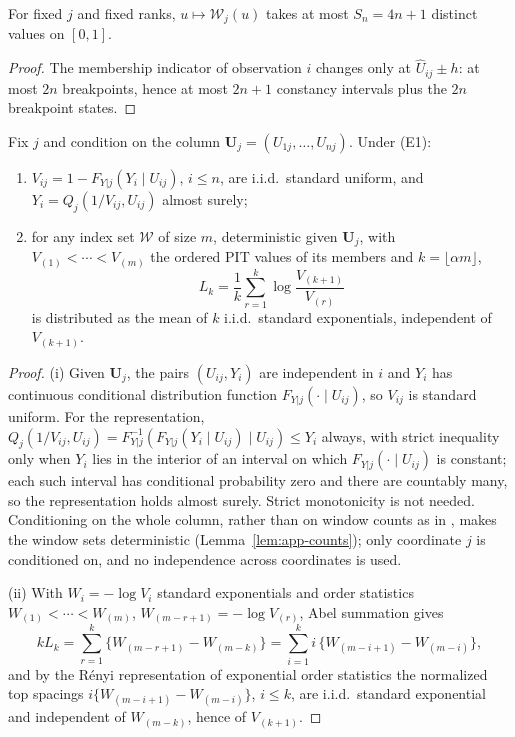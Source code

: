 \begin{lemma}\label{lem:app-states}
For fixed $j$ and fixed ranks, $u\mapsto\mathcal W_j(u)$ takes at most
$S_n=4n+1$ distinct values on $[0,1]$.
\end{lemma}

\begin{proof}
The membership indicator of observation $i$ changes only at
$\widehat U_{ij}\pm h$: at most $2n$ breakpoints, hence at most $2n+1$
constancy intervals plus the $2n$ breakpoint states.
\end{proof}

\begin{lemma}\label{lem:app-pit}
Fix $j$ and condition on the column $\bm U_j=(U_{1j},\ldots,U_{nj})$.
Under (E1):
\begin{enumerate}
\item $V_{ij}=1-F_{Y|j}(Y_i\mid U_{ij})$, $i\le n$, are i.i.d.\ standard
uniform, and $Y_i=Q_j(1/V_{ij},U_{ij})$ almost surely;
\item for any index set $\mathcal W$ of size $m$, deterministic given
$\bm U_j$, with $V_{(1)}<\cdots<V_{(m)}$ the ordered PIT values of its
members and $k=\lfloor\alpha m\rfloor$,
\[
 L_k=\frac1k\sum_{r=1}^k\log\frac{V_{(k+1)}}{V_{(r)}}
\]
is distributed as the mean of $k$ i.i.d.\ standard exponentials,
independent of $V_{(k+1)}$.
\end{enumerate}
\end{lemma}

\begin{proof}
(i) Given $\bm U_j$, the pairs $(U_{ij},Y_i)$ are independent in $i$ and
$Y_i$ has continuous conditional distribution function
$F_{Y|j}(\cdot\mid U_{ij})$, so $V_{ij}$ is standard uniform.  For the
representation, $Q_j(1/V_{ij},U_{ij})=F_{Y|j}^{-1}(F_{Y|j}(Y_i\mid U_{ij})\mid
U_{ij})\le Y_i$ always, with strict inequality only when $Y_i$ lies in the
interior of an interval on which $F_{Y|j}(\cdot\mid U_{ij})$ is constant; each
such interval has conditional probability zero and there are countably
many, so the representation holds almost surely.  Strict monotonicity is
not needed.  Conditioning on the whole column, rather than on window
counts as in \citet[Appendix, Lemma~4]{gardesPodgorny2025}, makes the
window sets deterministic (Lemma~\ref{lem:app-counts}); only coordinate
$j$ is conditioned on, and no independence across coordinates is used.

(ii) With $W_i=-\log V_i$ standard exponentials and order statistics
$W_{(1)}<\cdots<W_{(m)}$, $W_{(m-r+1)}=-\log V_{(r)}$, Abel summation
gives
\[
 kL_k=\sum_{r=1}^k\{W_{(m-r+1)}-W_{(m-k)}\}
 =\sum_{i=1}^k i\,\{W_{(m-i+1)}-W_{(m-i)}\},
\]
and by the R\'enyi representation of exponential order statistics
\citep{renyi1953} the normalized top spacings
$i\{W_{(m-i+1)}-W_{(m-i)}\}$, $i\le k$, are i.i.d.\ standard exponential
and independent of $W_{(m-k)}$, hence of $V_{(k+1)}$.
\end{proof}

